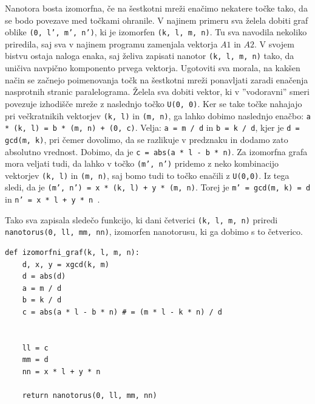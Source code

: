 \documentclass[a4paper, 10 pt, titlepage]{article}
\begin{document}
Nanotora bosta izomorfna, če na šestkotni mreži enačimo nekatere točke tako, da se bodo povezave med točkami ohranile. V najinem primeru sva želela dobiti graf oblike \texttt{(0, l', m', n')}, ki je izomorfen \texttt{(k, l, m, n)}. Tu sva navodila nekoliko priredila, saj sva v najinem programu zamenjala vektorja $A1$ in $A2$. V svojem bistvu ostaja naloga enaka, saj želiva zapisati nanotor \texttt{(k, l, m, n)} tako, da uničiva navpično komponento prvega vektorja. 
Ugotoviti sva morala, na kakšen način se začnejo poimenovanja točk na šestkotni mreži ponavljati zaradi enačenja nasprotnih stranic paralelograma. Želela sva dobiti vektor, ki v ''vodoravni'' smeri povezuje izhodišče mreže z naslednjo točko \texttt{U(0, 0)}. Ker se take točke nahajajo pri večkratnikih vektorjev \texttt{(k, l)} in \texttt{(m, n)}, ga lahko dobimo naslednjo enačbo: \texttt{a * (k, l) = b * (m, n) + (0, c)}. Velja: \texttt{a = m / d} in \texttt{b = k / d}, kjer je \texttt{d = gcd(m, k)}, pri čemer dovolimo, da se razlikuje v predznaku in dodamo zato absolutno vrednost. Dobimo, da je \texttt{c = abs(a * l - b * n)}.
Za izomorfna grafa mora veljati tudi, da lahko v točko \texttt{(m', n')} pridemo z neko kombinacijo vektorjev \texttt{(k, l)} in \texttt{(m, n)}, saj bomo tudi to točko enačili z \texttt{U(0,0)}. Iz tega sledi, da je \texttt{(m', n') = x * (k, l) + y * (m, n)}. Torej je \texttt{m' = gcd(m, k) = d} in \texttt{n' = x * l + y * n }.

Tako sva zapisala sledečo funkcijo, ki dani četverici \texttt{(k, l, m, n)} priredi \texttt{nanotorus(0, ll, mm, nn)}, izomorfen nanotorusu, ki ga dobimo s to četverico.

\begin{verbatim}
def izomorfni_graf(k, l, m, n):
    d, x, y = xgcd(k, m)
    d = abs(d)
    a = m / d
    b = k / d
    c = abs(a * l - b * n) # = (m * l - k * n) / d
    
    
    ll = c
    mm = d
    nn = x * l + y * n 
    
    return nanotorus(0, ll, mm, nn)
\end{verbatim}
\end{document}
